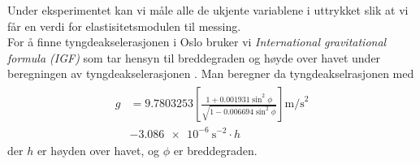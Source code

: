 \documentclass[%
 reprint,
 amsmath,amssymb,
 aps,
 norsk,
 booktabs
]{revtex4-1}
\begin{document}
Under eksperimentet kan vi måle alle de ukjente variablene i uttrykket slik at vi får en verdi for elastisitetsmodulen til messing.\\
For å finne tyngdeakselerasjonen i Oslo bruker vi \textit{International gravitational formula (IGF)} som tar hensyn til breddegraden og høyde over havet under beregningen av tyngdeakselerasjonen \cite{gravity}. Man beregner da tyngdeakselrasjonen med
\begin{align}
\begin{split}
  g &= 9.7803253\left[\frac{1+0.001931\sin^2{\phi}}{\sqrt{1-0.006694\sin^2{\phi}}}\right]\text{m/s}^2\\
      &- \SI{3.086e-6}{\second^{-2}}\cdot h \label{calc_g}
\end{split}
\end{align}
der $h$ er høyden over havet, og $\phi$ er breddegraden.
\end{document}
